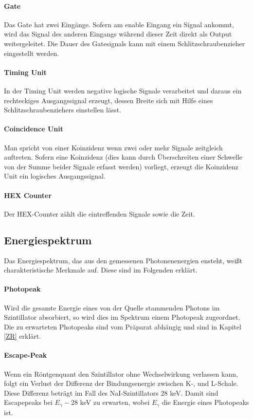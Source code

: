 \documentclass[12pt,listof=totoc]{scrartcl}
\begin{document}
 \paragraph{Gate} Das Gate hat zwei Eingänge. Sofern am enable Eingang ein Signal ankommt, wird das Signal des anderen Eingangs während dieser Zeit direkt als Output weitergeleitet. Die Dauer des Gatesignals kann mit einem Schlitzschraubenzieher eingestellt werden.
 \paragraph{Timing Unit}
 In der Timing Unit werden negative logische Signale verarbeitet und daraus ein rechteckiges Ausgangssignal erzeugt, dessen Breite sich mit Hilfe eines Schlitzschraubenziehers einstellen lässt.
 \paragraph{Coincidence Unit}
 Man spricht von einer Koinzidenz wenn zwei oder mehr Signale zeitgleich auftreten. Sofern eine Koinzidenz (dies kann durch Überschreiten einer Schwelle von der Summe beider Signale erfasst werden) vorliegt, erzeugt die Koinzidenz Unit ein logisches Ausgangssignal.
 \paragraph{HEX Counter}
Der HEX-Counter zählt die eintreffenden Signale sowie die Zeit.

\subsection{Energiespektrum}

Das Energiespektrum, das aus den gemessenen Photonenenergien ensteht, weißt  charakteristische Merkmale auf. Diese sind im Folgenden erklärt. 
 
 
 \paragraph{Photopeak}
 
 Wird die gesamte Energie eines von der Quelle stammenden Photons im Szintillator absorbiert, so wird dies im Spektrum einem Photopeak zugeordnet. Die zu erwarteten Photopeaks sind vom Präparat abhängig und sind in Kapitel \ref{ZR} erklärt.
 \paragraph{Escape-Peak}
 Wenn ein Röntgenquant den Szintillator ohne Wechselwirkung verlassen kann, folgt ein Verlust der Differenz der Bindungsenergie zwischen K-, und L-Schale. Diese Differenz beträgt im Fall des NaI-Szintillators $28$ keV. Damit sind Escapepeaks bei $E_\gamma - 28$ keV zu erwarten, wobei $E_\gamma$ die Energie eines Photopeaks ist.
\end{document}
